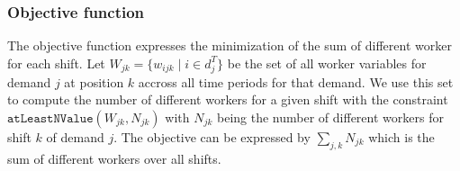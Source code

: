 \documentclass[../thesis.tex]{subfiles}
\begin{document}
\subsubsection{Objective function}

The objective function expresses the minimization of the sum of different worker for each shift.
Let $W_{jk} = \{ w_{ijk} \mid i \in d^T_j \}$ be the set of all worker variables for demand $j$ at position $k$ accross all time periods for that demand.
We use this set to compute the number of different workers for a given shift with the constraint
$\texttt{atLeastNValue}(W_{jk}, N_{jk})$ with $N_{jk}$ being the number of different workers for shift $k$ of demand $j$.
The objective can be expressed by $\sum_{j, k} N_{jk}$ which is the sum of different workers over all shifts. 
\end{document}
